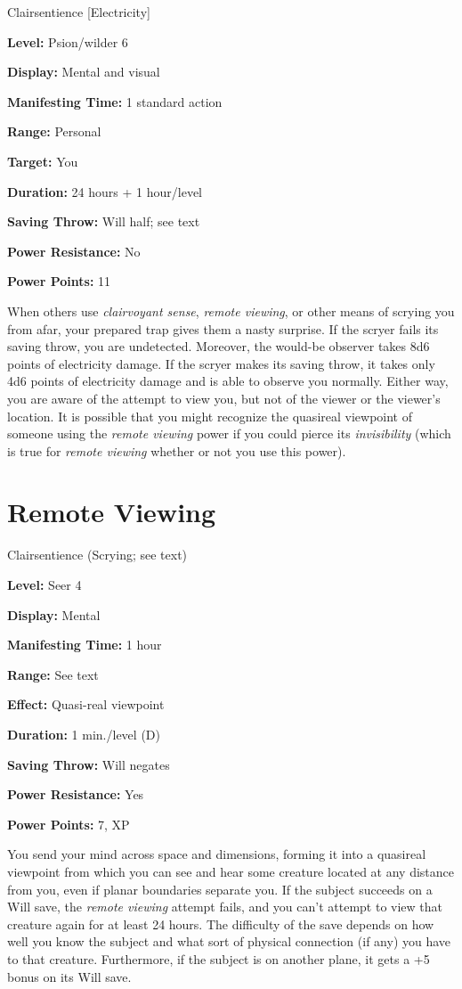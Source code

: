 \documentclass{article}
\begin{document}
Clairsentience [Electricity]

\textbf{Level:} Psion/wilder 6

\textbf{Display:} Mental and visual

\textbf{Manifesting Time:} 1 standard action

\textbf{Range:} Personal

\textbf{Target:} You

\textbf{Duration:} 24 hours + 1 hour/level

\textbf{Saving Throw:} Will half; see text

\textbf{Power Resistance:} No

\textbf{Power Points:} 11

When others use \textit{clairvoyant sense}, \textit{remote viewing}, or other means 
of scrying you from afar, your prepared trap gives them a nasty surprise. If the 
scryer fails its saving throw, you are undetected. Moreover, the would-be observer 
takes 8d6 points of electricity damage. If the scryer makes its saving throw, it 
takes only 4d6 points of electricity damage and is able to observe you normally. 
Either way, you are aware of the attempt to view you, but not of the viewer or 
the viewer's location. It is possible that you might recognize the quasireal viewpoint 
of someone using the \textit{remote viewing }power if you could pierce its \textit{invisibility 
}(which is true for \textit{remote viewing }whether or not you use this power).

\vspace{12pt}
\section*{Remote Viewing}

Clairsentience (Scrying; see text)

\textbf{Level:} Seer 4

\textbf{Display:} Mental

\textbf{Manifesting Time:} 1 hour

\textbf{Range:} See text

\textbf{Effect:} Quasi-real viewpoint

\textbf{Duration:} 1 min./level (D)

\textbf{Saving Throw:} Will negates

\textbf{Power Resistance:} Yes

\textbf{Power Points:} 7, XP

You send your mind across space and dimensions, forming it into a quasireal viewpoint 
from which you can see and hear some creature located at any distance from you, 
even if planar boundaries separate you. If the subject succeeds on a Will save, 
the \textit{remote viewing }attempt fails, and you can't attempt to view that creature 
again for at least 24 hours. The difficulty of the save depends on how well you 
know the subject and what sort of physical connection (if any) you have to that 
creature. Furthermore, if the subject is on another plane, it gets a +5 bonus on 
its Will save.
\end{document}
